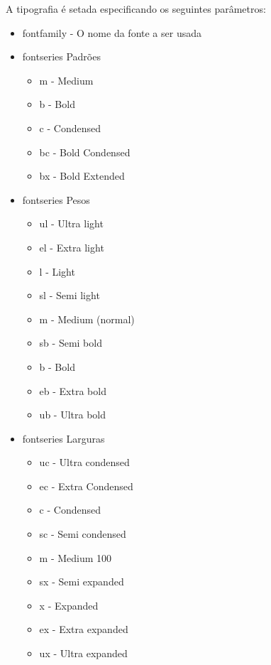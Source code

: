     A tipografia é setada especificando os seguintes parâmetros:

    \begin{itemize}
        \item fontfamily - O nome da fonte a ser usada

        \item fontseries Padrões
            \begin{itemize}
                \item m - Medium
                \item b - Bold
                \item c - Condensed
                \item bc - Bold Condensed
                \item bx - Bold Extended
            \end{itemize}

        \item fontseries Pesos
            \begin{itemize}
                \item ul - Ultra light
                \item el - Extra light
                \item l - Light
                \item sl - Semi light
                \item m - Medium (normal)
                \item sb - Semi bold
                \item b - Bold
                \item eb - Extra bold
                \item ub - Ultra bold
            \end{itemize}

        \item fontseries Larguras
            \begin{itemize}
                \item uc - Ultra condensed
                \item ec - Extra Condensed
                \item c -  Condensed
                \item sc - Semi condensed
                \item m - Medium 100
                \item sx - Semi expanded
                \item x - Expanded
                \item ex - Extra expanded
                \item ux - Ultra expanded
            \end{itemize}


\end{itemize}
